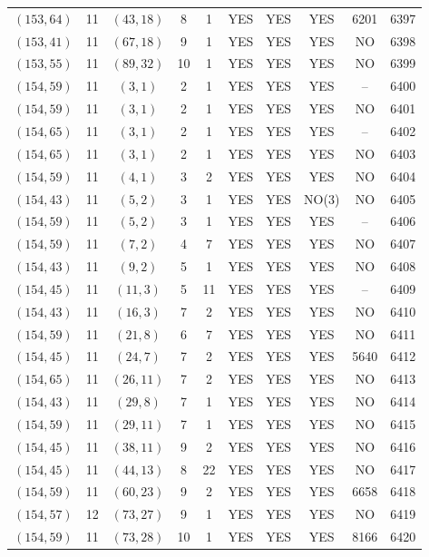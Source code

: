 \begin{longtable}{|c|c|c|c|c|c|c|c|c|c|}
$(153, 64)$ & 11 & $(43, 18)$ & 8 & 1 & YES & YES & YES & 6201 & 6397\\
$(153, 41)$ & 11 & $(67, 18)$ & 9 & 1 & YES & YES & YES & NO & 6398\\
$(153, 55)$ & 11 & $(89, 32)$ & 10 & 1 & YES & YES & YES & NO & 6399\\
$(154, 59)$ & 11 & $(3, 1)$ & 2 & 1 & YES & YES & YES & -- & 6400\\
$(154, 59)$ & 11 & $(3, 1)$ & 2 & 1 & YES & YES & YES & NO & 6401\\
$(154, 65)$ & 11 & $(3, 1)$ & 2 & 1 & YES & YES & YES & -- & 6402\\
$(154, 65)$ & 11 & $(3, 1)$ & 2 & 1 & YES & YES & YES & NO & 6403\\
$(154, 59)$ & 11 & $(4, 1)$ & 3 & 2 & YES & YES & YES & NO & 6404\\
$(154, 43)$ & 11 & $(5, 2)$ & 3 & 1 & YES & YES & NO(3) & NO & 6405\\
$(154, 59)$ & 11 & $(5, 2)$ & 3 & 1 & YES & YES & YES & -- & 6406\\
$(154, 59)$ & 11 & $(7, 2)$ & 4 & 7 & YES & YES & YES & NO & 6407\\
$(154, 43)$ & 11 & $(9, 2)$ & 5 & 1 & YES & YES & YES & NO & 6408\\
$(154, 45)$ & 11 & $(11, 3)$ & 5 & 11 & YES & YES & YES & -- & 6409\\
$(154, 43)$ & 11 & $(16, 3)$ & 7 & 2 & YES & YES & YES & NO & 6410\\
$(154, 59)$ & 11 & $(21, 8)$ & 6 & 7 & YES & YES & YES & NO & 6411\\
$(154, 45)$ & 11 & $(24, 7)$ & 7 & 2 & YES & YES & YES & 5640 & 6412\\
$(154, 65)$ & 11 & $(26, 11)$ & 7 & 2 & YES & YES & YES & NO & 6413\\
$(154, 43)$ & 11 & $(29, 8)$ & 7 & 1 & YES & YES & YES & NO & 6414\\
$(154, 59)$ & 11 & $(29, 11)$ & 7 & 1 & YES & YES & YES & NO & 6415\\
$(154, 45)$ & 11 & $(38, 11)$ & 9 & 2 & YES & YES & YES & NO & 6416\\
$(154, 45)$ & 11 & $(44, 13)$ & 8 & 22 & YES & YES & YES & NO & 6417\\
$(154, 59)$ & 11 & $(60, 23)$ & 9 & 2 & YES & YES & YES & 6658 & 6418\\
$(154, 57)$ & 12 & $(73, 27)$ & 9 & 1 & YES & YES & YES & NO & 6419\\
$(154, 59)$ & 11 & $(73, 28)$ & 10 & 1 & YES & YES & YES & 8166 & 6420\\

\end{longtable}
